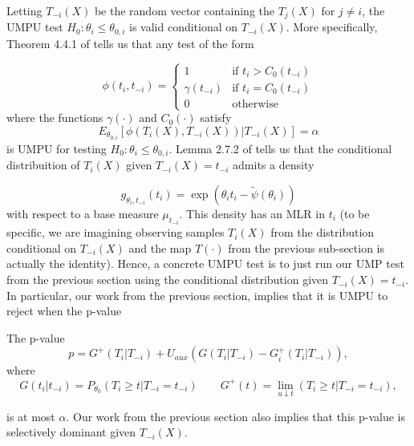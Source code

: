 \documentclass{article}
\begin{document}
\begin{appendix}
Letting $T_{-i}(X)$ be the random vector containing the $T_j(X)$ for $j \neq i$, the UMPU test $H_0: \theta_i \leq \theta_{0, i}$ is valid conditional on $T_{-i}(X)$. More specifically, Theorem 4.4.1 of \cite{Lehmann} tells us that any test of the form 

\begin{equation*}
    \label{eq:exp_fam_test}
    \phi(t_i, t_{-i}) = \begin{cases}
        1 &\text{if } t_i > C_0(t_{-i})  \\
        \gamma(t_{-i}) &\text{if } t_i = C_0(t_{-i})   \\
        0 & \text{otherwise }
    \end{cases}
\end{equation*}
where the functions $\gamma(\cdot)$ and $C_0(\cdot)$ satisfy 
\begin{equation*}
    E_{\theta_{0, i}}[\phi(T_i(X), T_{-i}(X)) | T_{-i}(X) ] = \alpha
\end{equation*}
is UMPU for testing $H_0: \theta_i \leq \theta_{0, i}$. Lemma 2.7.2 of \cite{Lehmann} tells us that the conditional distribuition of $T_{i}(X)$ given $T_{-i}(X) = t_{-i}$ admits a density 

\begin{equation*}
    g_{\theta_i, t_{-i}}(t_i) = \exp(\theta_i t_i - \tilde{\psi}(\theta_i))  
\end{equation*}
with respect to a base measure $\mu_{t_{-i}}$. This density has an MLR in $t_i$ (to be specific, we are imagining observing samples $T_i(X)$ from the distribution conditional on $T_{-i}(X)$ and the map $T(\cdot)$ from the previous sub-section is actually the identity). Hence, a concrete UMPU test is to just run our UMP test from the previous section using the conditional distribution given $T_{-i}(X) = t_{-i}$. In particular, our work from the previous section, implies that it is UMPU to reject when the p-value


The p-value 
\begin{equation}
    \label{eq:ump_exp_fam}
    p = G^{+}(T_i|T_{-i}) + U_{aux}(G(T_i|T_{-i}) - G^{+}_i(T_i|T_{-i})),
\end{equation}
where 
\begin{equation*}
    G(t_i | t_{-i}) = P_{\theta_0}(T_i \geq t | T_{-i} = t_{-i}) \qquad G^{+}(t) = \lim_{u \downarrow t}(T_i \geq t | T_{-i} = t_{-i} ),
\end{equation*}

is at most $\alpha$. Our work from the previous section also implies that this p-value is selectively dominant given $T_{-i}(X)$. 



\end{appendix}
\end{document}
